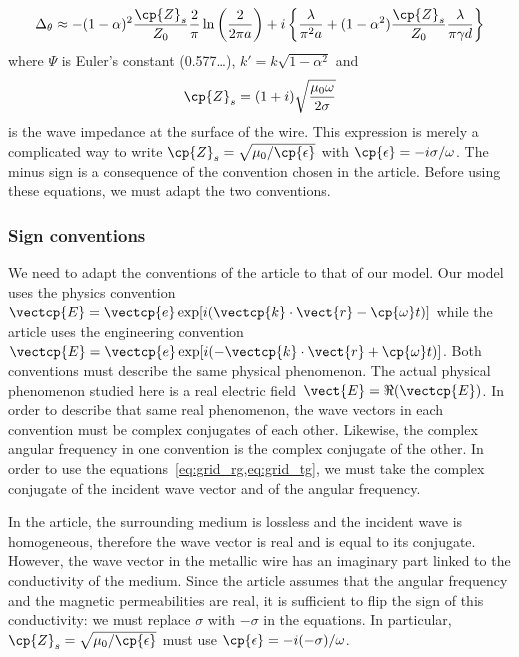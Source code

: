 \begin{equation}
    \Delta_\theta
    \approx
    -(1-\alpha)^2
    \frac{\cp{Z}_s}{Z_0}
    \frac{2}{\pi}
    \ln \left(
        \frac{2}{2\pi a}
    \right)
    +
    i
    \left\lbrace
        \frac{\lambda}{\pi^2 a}
        +
        (1-\alpha^2)
        \frac{\cp{Z}_s}{Z_0}
        \frac{\lambda}{\pi \gamma d}
    \right\rbrace
\end{equation}
where $\Psi$ is Euler's constant (\num{0.577}\dots), $k'= k \sqrt{1-\alpha^2}$ and
\begin{equation}
    \cp{Z}_s = (1 + i) \sqrt{\frac{\mu_0 \omega}{2 \sigma}}
\end{equation}
is the wave impedance at the surface of the wire.
This expression is merely a complicated way to write
$\cp{Z}_s = \sqrt{\mu_0 / \cp{\epsilon}}$ with $\cp{\epsilon}=-i \sigma / \omega$.
The minus sign is a consequence of the convention chosen in the article.
Before using these equations, we must adapt the two conventions.

\subsubsection{Sign conventions}
We need to adapt the conventions of the article to that of our model.
Our model uses the physics convention
$\vectcp{E}=\vectcp{e} \exp[i(\vectcp{k}\cdot \vect{r} - \cp{\omega}t)]$ while the article uses the engineering convention
$\vectcp{E}=\vectcp{e} \exp[i(-\vectcp{k}\cdot \vect{r} + \cp{\omega}t)]$.
Both conventions must describe the same physical phenomenon.
The actual physical phenomenon studied here is a
real electric field~$\vect{E} = \Re(\vectcp{E})$.
In order to describe that same real phenomenon, the wave vectors in each convention must be complex conjugates of each other.
Likewise, the complex angular frequency in one convention is the complex conjugate of the other.
In order to use the equations~\cref{eq:grid_rg,eq:grid_tg}, we must take the complex conjugate of the incident wave vector and of the angular frequency.

In the article, the surrounding medium is lossless and the incident wave is homogeneous, therefore the wave vector is real and is equal to its conjugate.
However, the wave vector in the metallic wire has an imaginary part linked to the conductivity of the medium.
Since the article assumes that the angular frequency and the magnetic permeabilities are real, it is sufficient to flip the sign of this conductivity: we must replace $\sigma$ with $-\sigma$ in the equations.
In particular, $\cp{Z}_s = \sqrt{\mu_0 / \cp{\epsilon}}$ must use
$\cp{\epsilon} = -i (-\sigma) / \omega$.

